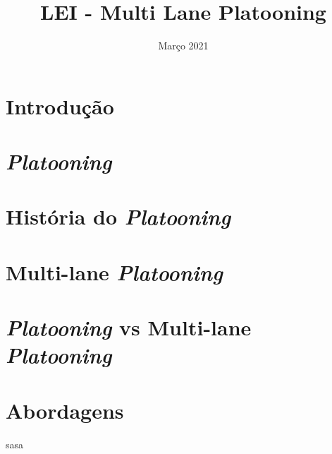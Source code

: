 \documentclass{article}
\title{LEI - Multi Lane Platooning}
\author{}
\date{Março 2021}
\begin{document}
\maketitle
\newpage
\section{Introdução}

\newpage

\section{\textit{Platooning}}

\newpage

\section{História do \textit{Platooning}}

\newpage

\section{Multi-lane \textit{Platooning}}

\newpage

\section{\textit{Platooning} vs Multi-lane \textit{Platooning}}

\newpage

\section{Abordagens}

\newpage

sasa
\end{document}
